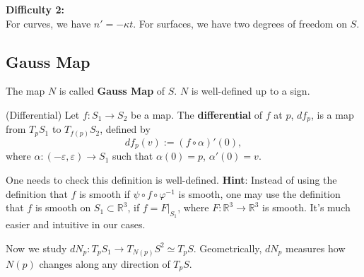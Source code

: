 \documentclass{article}
\begin{document}
\textbf{Difficulty 2:} \\
For curves, we have $n' = -\kappa t$. For surfaces, we have two degrees of freedom on $S$.
\subsection{Gauss Map}
\begin{definition}
    The map $N$ is called \textbf{Gauss Map} of $S$. $N$ is well-defined up to a sign.
\end{definition}

\begin{definition}
    (Differential)
    Let $f: S_1 \to S_2$ be a map. The \textbf{differential} of $f$ at $p$, $d f_p$, is a map from $T_p S_1$ to $T_{f(p)} S_2$, defined by
    $$d f_p (v) := (f \circ \alpha)'(0),$$
    where $\alpha: (-\varepsilon, \varepsilon) \to S_1$ such that $\alpha(0) = p$, $\alpha'(0) = v$.
\end{definition}

\begin{remark}
    One needs to check this definition is well-defined.
    \textbf{Hint}: Instead of using the definition that $f$ is smooth if $\psi \circ f \circ \varphi^{-1}$ is smooth, one may use the definition that $f$ is smooth on $S_1 \subset \mathbb{R}^3$, if $f = F|_{S_1}$, where $F: \mathbb{R}^3 \to \mathbb{R}^3$ is smooth. It's much easier and intuitive in our cases.
\end{remark}

Now we study $d N_p: T_p S_1 \to T_{N(p)} S^2 \simeq T_p S$.
Geometrically, $d N_p$ measures how $N(p)$ changes along any direction of $T_p S$.
\end{document}
